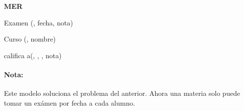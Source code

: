 \vspace*{1cm}

\begin{multicols}{2}
	\textbf{MER}
	
	Examen	(, fecha, nota)
	
	Curso	(, nombre)
	
	califica a(, , , nota)
	
	\columnbreak
	
	\paragraph{Nota:} Este modelo soluciona el problema del anterior. Ahora una materia solo puede tomar un exámen por fecha a cada alumno.
\end{multicols}

